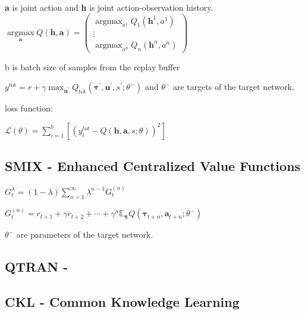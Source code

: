 \begin{center}
	\textbf{a} is joint action and \textbf{h} is joint action-observation history.
$\underset{\mathbf{a}}{\operatorname{argmax}} Q(\textbf{h}, \mathbf{a})=\left(\begin{array}{c}\operatorname{argmax}_{a^{1}} Q_{1}\left(\textbf{h}^{1}, a^{1}\right) \\ \vdots \\ \operatorname{argmax}_{a^{n}} Q_{n}\left(\textbf{h}^{n}, a^{n}\right)\end{array}\right)$
\end{center}

\begin{center}
	b is batch size of samples from the replay buffer
	
	$y^{\text {tot}}=r+\gamma \max _{\mathbf{u}^{\prime}} Q_{\text {tot}}\left(\boldsymbol{\tau}^{\prime}, \mathbf{u}^{\prime}, s^{\prime} ; \theta^{-}\right)$ and $\theta^{-}$ are targets of the target network.
	
	loss function:
	
$\mathcal{L}(\theta)=\sum_{i=1}^{b}\left[\left(y_{i}^{t o t}-Q(\textbf{h}, \mathbf{a}, s ; \theta)\right)^{2}\right]$
\end{center}


\subsection{SMIX - Enhanced Centralized Value Functions}


\begin{center}
$G_{t}^{\lambda}=(1-\lambda) \sum_{n=1}^{\infty} \lambda^{n-1} G_{t}^{(n)}$

$G_{t}^{(n)}=r_{t+1}+\gamma r_{t+2}+\cdots+\gamma^{n} \mathbb{E}_{\boldsymbol{\pi}} Q\left(\boldsymbol{\tau}_{t+n}, \mathbf{a}_{t+n} ; \theta^{-}\right)$

$\theta^{-}$ are parameters of the target network.

\end{center}


\subsection{QTRAN - }

\subsection{CKL - Common Knowledge Learning}

